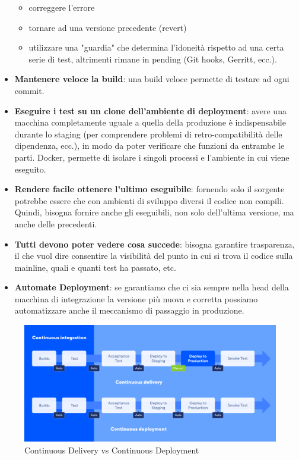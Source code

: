 \begin{itemize}
\begin{itemize}
    \item correggere l'errore
    \item tornare ad una versione precedente (revert)
    \item utilizzare una "guardia" che determina l'idoneità rispetto ad una certa serie di test, altrimenti rimane in pending (Git hooks, Gerritt, ecc.).
\end{itemize}
\item \textbf{Mantenere veloce la build}: una build veloce permette di testare ad ogni commit.
\item \textbf{Eseguire i test su un clone dell'ambiente di deployment}: avere una macchina completamente uguale a quella della produzione è indispensabile durante lo staging (per comprendere problemi di retro-compatibilità delle dipendenza, ecc.), in modo da poter verificare che funzioni da entrambe le parti. Docker, permette di isolare i singoli processi e l'ambiente in cui viene eseguito.
\item \textbf{Rendere facile ottenere l'ultimo eseguibile}: fornendo solo il sorgente potrebbe essere che con ambienti di sviluppo diversi il codice non compili. Quindi, bisogna fornire anche gli eseguibili, non solo dell'ultima versione, ma anche delle precedenti.
\item \textbf{Tutti devono poter vedere cosa succede}: bisogna garantire trasparenza, il che vuol dire consentire la visibilità del punto in cui si trova il codice sulla mainline, quali e quanti test ha passato, etc.
\item \textbf{Automate Deployment}: se garantiamo che ci sia sempre nella head della macchina di integrazione la versione più nuova e corretta possiamo automatizzare anche il meccanismo di passaggio in produzione.
\end{itemize}

\begin{figure}[H]
	\centering
	 \includegraphics[width=\linewidth]{img/CI-CD.png}
	 \caption{Continuous Delivery vs Continuous Deployment}
\end{figure}

